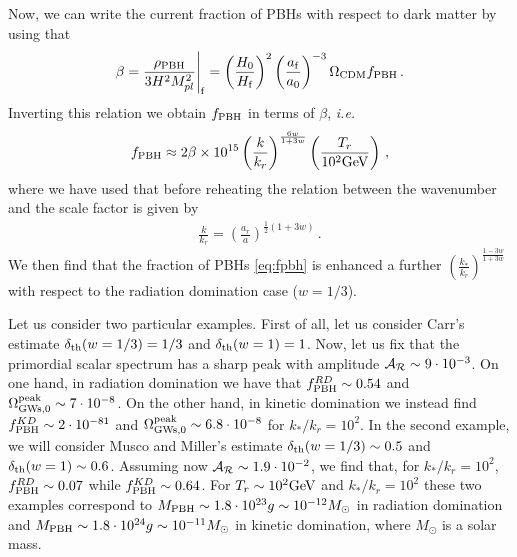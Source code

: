 \documentclass[aps,10pt,prd,groupedaddress,nofootinbib,notitlepage,eqsecnum,preprintnumbers]{revtex4-1}
\begin{document}
Now, we can write the current fraction of PBHs with respect to dark matter by using that \cite{Sasaki:2018dmp}
\begin{align}
\beta=\frac{\rho_{\rm PBH}}{3H^2M_{pl}^2}\Bigg|_{\rm f}=\left(\frac{H_0}{H_{\rm f}}\right)^2\left(\frac{a_{\rm f}}{a_0}\right)^{-3}\Omega_{{\rm CDM}}f_{\rm PBH}\,.
\end{align}
Inverting this relation we obtain $f_{\rm PBH}$ in terms of $\beta$, \textit{i.e.}
\begin{align}\label{eq:fpbh}
f_{\rm PBH}\approx 2\beta\times 10^{15}\left(\frac{k}{k_r}\right)^{\frac{6w}{1+3w}}\left(\frac{T_r}{10^2{\rm GeV}}\right)\,,
\end{align}
where we have used that before reheating the relation between the wavenumber and the scale factor is given by
\begin{align}
\frac{k}{k_r}=\left(\frac{a_r}{a}\right)^{\tfrac{1}{2}(1+3w)}\,.
\end{align}
We then find that the fraction of PBHs \eqref{eq:fpbh} is enhanced a further $\left(\frac{k_*}{k_r}\right)^{\frac{1-3w}{1+3w}}$ with respect to the radiation domination case ($w=1/3$). %


Let us consider two particular examples. First of all, let us consider Carr's estimate \cite{Sasaki:2018dmp} $\delta_{\rm th}(w=1/3)=1/3$ and $\delta_{\rm th}(w=1)=1$. Now, let us fix that the primordial scalar spectrum has a sharp peak with amplitude ${\cal A}_{\cal R}\sim 9\cdot 10^{-3}$. On one hand, in radiation domination we have that $f^{RD}_{\rm PBH}\sim 0.54$ and $\Omega_{\rm GWs,0}^{\rm peak}\sim 7\cdot 10^{-8}$. On the other hand, in kinetic domination we instead find $f^{KD}_{\rm PBH}\sim 2\cdot 10^{-81}$ and $\Omega_{\rm GWs,0}^{\rm peak}\sim 6.8\cdot 10^{-8}$ for $k_*/k_r=10^2$. In the second example, we will consider Musco and Miller's estimate \cite{Musco:2012au} $\delta_{\rm th}(w=1/3)\sim 0.5$ and $\delta_{\rm th}(w=1)\sim 0.6$. Assuming now ${\cal A}_{\cal R}\sim 1.9\cdot 10^{-2}$, we find that, for $k_*/k_r=10^2$, $f^{RD}_{\rm PBH}\sim 0.07$ while $f^{KD}_{\rm PBH}\sim 0.64$. For $T_r\sim 10^2{\rm GeV}$ and $k_*/k_r=10^2$ these two examples correspond to $M_{\rm PBH}\sim 1.8\cdot 10^{23}g\sim 10^{-12}M_\odot$ in radiation domination and $M_{\rm PBH}\sim 1.8\cdot 10^{24}g\sim 10^{-11}M_\odot$ in kinetic domination, where $M_\odot$ is a solar mass.
\end{document}
